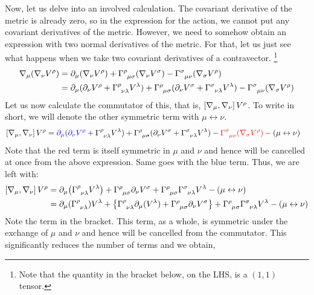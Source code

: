 Now, let us delve into an involved calculation. The covariant derivative of the metric is already zero, so in the expression for the action, we cannot put any covariant derivatives of the metric. However, we need to somehow obtain an expression with two normal derivatives of the metric. For that, let us just see what happens when we take two covariant derivatives of a contravector. \footnote{Note that the quantity in the bracket below, on the LHS, is a $(1,1)$ tensor.}
\begin{align*}
    \covd{\mu}(\covd{\nu}V^\rho) &= \partial_\mu (\covd{\nu}V^\rho) + \chris{\rho}{\mu}{\sigma}(\covd{\nu}V^\sigma) -\chris{\sigma}{\mu}{\nu}(\covd{\sigma}V^\rho)\\
    &=\partial_\mu (\partial_{\nu}V^\rho + \chris{\rho}{\nu}{\lambda}V^\lambda) + \chris{\rho}{\mu}{\sigma}(\partial_{\nu}V^\sigma + \chris{\sigma}{\nu}{\lambda}V^\lambda) -\chris{\sigma}{\mu}{\nu}(\covd{\sigma}V^\rho)
\end{align*}
Let us now calculate the commutator of this, that is, $\left[ \nabla_{\mu}, \nabla_{\nu} \right]V^\rho$. To write in short, we will denote the other symmetric term with $\mu \leftrightarrow \nu$. 
\begin{align*}
    \comtr{\covd{\mu}}{\covd{\nu}}V^\rho &= \mathcolor{blue}{\partial_\mu} (\mathcolor{blue}{\partial_{\nu}V^\rho} + \chris{\rho}{\nu}{\lambda}V^\lambda) + \chris{\rho}{\mu}{\sigma}(\partial_{\nu}V^\sigma + \chris{\sigma}{\nu}{\lambda}V^\lambda) -\mathcolor{red}{\chris{\sigma}{\mu}{\nu}(\covd{\sigma}V^\rho)} - (\mu \leftrightarrow \nu)
\end{align*}
Note that the red term is itself symmetric in $\mu$ and $\nu$ and hence will be cancelled at once from the above expression. Same goes with the blue term. Thus, we are left with:
\begin{align*}
    \comtr{\covd{\mu}}{\covd{\nu}}V^\rho &= {\partial_\mu}\qty(\chris{\rho}{\nu}{\lambda}V^\lambda )+ \chris{\rho}{\mu}{\sigma}\partial_{\nu}V^\sigma  + \chris{\rho}{\mu}{\sigma}\chris{\sigma}{\nu}{\lambda}V^\lambda - (\mu \leftrightarrow \nu)\\
    &=\partial_\mu(\chris{\rho}{\nu}{\lambda})V^\lambda +\qty{\chris{\rho}{\nu}{\lambda}\partial_\mu(V^\lambda)+  \chris{\rho}{\mu}{\sigma}\partial_{\nu}V^\sigma}  + \chris{\rho}{\mu}{\sigma}\chris{\sigma}{\nu}{\lambda}V^\lambda - (\mu \leftrightarrow \nu)
\end{align*}
Note the term in the bracket. This term, as a whole, is symmetric under the exchange of $\mu$ and $\nu$ and hence will be cancelled from the commutator. This significantly reduces the number of terms and we obtain,
